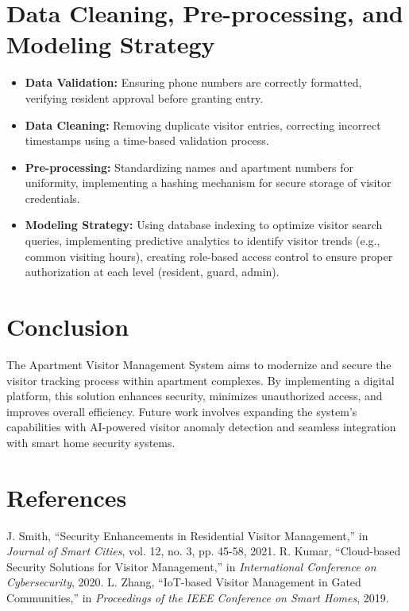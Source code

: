\documentclass[sigconf]{acmart}
\begin{document}
\section{Data Cleaning, Pre-processing, and Modeling Strategy}
\begin{itemize}
    \item \textbf{Data Validation:} Ensuring phone numbers are correctly formatted, verifying resident approval before granting entry.
    \item \textbf{Data Cleaning:} Removing duplicate visitor entries, correcting incorrect timestamps using a time-based validation process.
    \item \textbf{Pre-processing:} Standardizing names and apartment numbers for uniformity, implementing a hashing mechanism for secure storage of visitor credentials.
    \item \textbf{Modeling Strategy:} Using database indexing to optimize visitor search queries, implementing predictive analytics to identify visitor trends (e.g., common visiting hours), creating role-based access control to ensure proper authorization at each level (resident, guard, admin).
\end{itemize}

\section{Conclusion}
The Apartment Visitor Management System aims to modernize and secure the visitor tracking process within apartment complexes. By implementing a digital platform, this solution enhances security, minimizes unauthorized access, and improves overall efficiency. Future work involves expanding the system’s capabilities with AI-powered visitor anomaly detection and seamless integration with smart home security systems.

\section{References}
\begin{thebibliography}{9}
 J. Smith, ``Security Enhancements in Residential Visitor Management,'' in \textit{Journal of Smart Cities}, vol. 12, no. 3, pp. 45-58, 2021.
 R. Kumar, ``Cloud-based Security Solutions for Visitor Management,'' in \textit{International Conference on Cybersecurity}, 2020.
 L. Zhang, ``IoT-based Visitor Management in Gated Communities,'' in \textit{Proceedings of the IEEE Conference on Smart Homes}, 2019.
\end{thebibliography}
\end{document}
